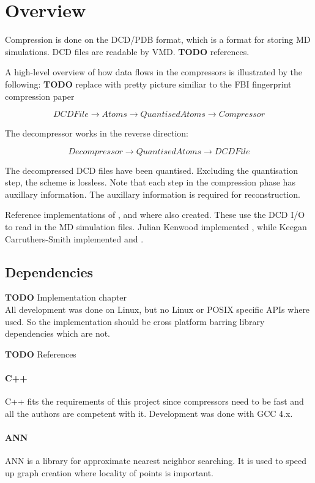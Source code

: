\documentclass{report}
\newcommand{\todo}{\textbf{TODO} }
\begin{document}
\section{Overview}

Compression is done on the DCD/PDB format, which is a format for storing MD
simulations. DCD files are readable by VMD. \todo references.

A high-level overview of how data flows in the compressors is illustrated by
the following: \todo replace with pretty picture similiar to the FBI
fingerprint compression paper

\[ DCDFile \to Atoms \to QuantisedAtoms \to Compressor \]

The decompressor works in the reverse direction:

\[ Decompressor \to QuantisedAtoms \to DCDFile \]

The decompressed DCD files have been quantised. Excluding the quantisation
step, the scheme is lossless. Note that each step in the compression phase has
auxillary information. The auxillary information is required for
reconstruction.

Reference implementations of \citep{devillers2000gci}, \citep{gumholdcomp} and
\citep{omeltchenko2000sls} where also created. These use the DCD I/O to read
in the MD simulation files. Julian Kenwood implemented
\citep{omeltchenko2000sls}, while Keegan Carruthers-Smith implemented
\citep{devillers2000gci} and \citep{gumholdcomp}.


\subsection{Dependencies}

\todo Implementation chapter \\

All development was done on Linux, but no Linux or POSIX specific APIs where
used. So the implementation should be cross platform barring library
dependencies which are not.

\todo References

\paragraph{C++}
C++ fits the requirements of this project since compressors need to be fast
and all the authors are competent with it. Development was done with GCC 4.x.

\paragraph{ANN}
ANN is a library for approximate nearest neighbor searching. It is used to
speed up graph creation where locality of points is important.
\end{document}
